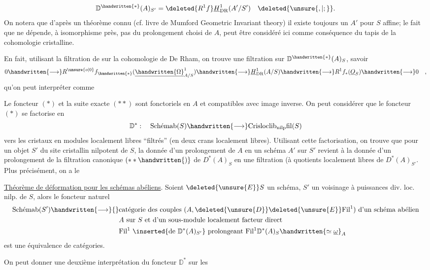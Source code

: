\[
\mathbb{D}^{\handwritten{*}}(A)_{S'}=\deleted{R^1 f}\underline{H}_{\mathrm{DR}}^1(A'/S')\quad\deleted{\unsure{,|;}}.
\]
On notera que d'après un théorème connu (cf. livre de Mumford Geometric Invariant theory) il existe toujours un $A'$ pour $S$ affine; le fait que  ne dépende, à isomorphisme près, pas du prolongement choisi de $A$, peut être considéré ici comme conséquence du tapis de la cohomologie cristalline.

En fait, utilisant la filtration de  sur la cohomologie de De Rham, on trouve une filtration sur $\mathbb{D}^{\handwritten{*}}(A)_S$, savoir
\[
0\handwritten{\longrightarrow}R^{\unsure{o|0}} f_{\handwritten{*}}(\underline{\handwritten{\Omega}}^1_{A/S})\handwritten{\longrightarrow}\underline{H}_{\mathrm{DR}}^1(A/S)\handwritten{\longrightarrow}R^1 f_*(\underline{O}_S)\handwritten{\longrightarrow}0\quad,
\]
qu'on peut interpréter comme

Le foncteur $(*)$ et la suite exacte $(**)$ sont fonctoriels en $A$ et compatibles avec image inverse. On peut  considérer que le foncteur $(*)$ se factorise en
\[
\mathbb{D}^*:\quad\text{Schémab}(S)\handwritten{\longrightarrow}\mathrm{Crisloclib}_{\mathrm{nilp}}\mathrm{fil}(S)
\]
vers les cristaux en modules localement libres ``filtrés'' (en deux crans localement libres). Utilisant cette factorisation, on trouve que pour un objet $S'$ du site cristallin nilpotent de $S$, la\unsure{,|{}} donnée d'un prolongement de $A$ en un schéma  $A'$ sur $S'$ revient à la donnée d'un prolongement de la filtration canonique $(**\handwritten{)}$ de $D^*(A)_S$ en une filtration (à quotients localement libres\handwritten{)} de $D^*(A)_{S'}$. Plus précisément, on a le

\uline{Théorème de déformation pour les schémas abéliens}. Soient $\deleted{\unsure{E}}S$ un schéma, $S'$ un voisinage à puissances div. loc. nilp. de $S$, alors le foncteur naturel
\[
\begin{aligned}
\text{Schémab}(S')\handwritten{\longrightarrow}{}&
\text{catégorie des couples }(A,\deleted{\unsure{D}}\deleted{\unsure{E}}\mathrm{Fil}^1)\text{ d'un schéma abélien}\\
& A\text{ sur }S\text{ et d'un sous-module localement facteur direct}\\
&\mathrm{Fil}^1\ \inserted{\text{de }\mathbb{D}^*(A)_{S'}}\text{ prolongeant }\mathrm{Fil}^1\mathbb{D}^*(A)_S\handwritten{\simeq\underline{\omega}}_A
\end{aligned}
\]
est une équivalence de catégories.

 On peut donner une deuxième interprétation du foncteur $\mathbb{D}^*$ sur les
